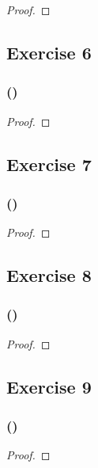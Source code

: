 \documentclass[14pt]{extarticle}
\begin{document}
\begin{proof}

\end{proof}

\subsection{Exercise 6}

\subsubsection{()}

\begin{proof}

\end{proof}

\subsection{Exercise 7}

\subsubsection{()}

\begin{proof}

\end{proof}

\subsection{Exercise 8}

\subsubsection{()}

\begin{proof}

\end{proof}

\subsection{Exercise 9}

\subsubsection{()}

\begin{proof}

\end{proof}
\end{document}
